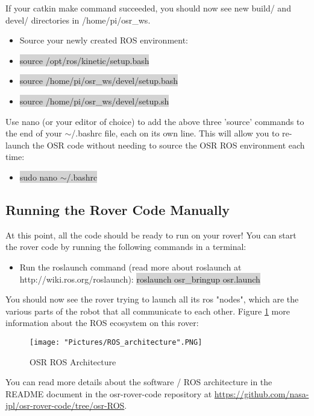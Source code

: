 \documentclass[12pt]{article}
\begin{document}
\noindent If your catkin make command succeeded, you should now see new build/ and devel/ directories in /home/pi/osr\_ws.

\begin{itemize}
	\item[] Source your newly created ROS environment: 
	\item[] \colorbox{lightgray}{source /opt/ros/kinetic/setup.bash}
	\item[] \colorbox{lightgray}{source /home/pi/osr\_ws/devel/setup.bash}
	\item[] \colorbox{lightgray}{source /home/pi/osr\_ws/devel/setup.sh}
\end{itemize}

\noindent Use nano (or your editor of choice) to add the above three 'source' commands to the end of your $\sim$/.bashrc file, each on its own line.  This will allow you to re-launch the OSR code without needing to source the OSR ROS environment each time:
\begin{itemize}
	\item[] \colorbox{lightgray}{sudo nano $\sim$/.bashrc}
\end{itemize}

\subsection{Running the Rover Code Manually}
At this point, all the code should be ready to run on your rover!  You can start the rover code by running the following commands in a terminal:
\begin{itemize}
	\item[] Run the roslaunch command (read more about roslaunch at http://wiki.ros.org/roslaunch): \colorbox{lightgray}{roslaunch osr\_bringup osr.launch}
\end{itemize}

\noindent You should now see the rover trying to launch all its ros "nodes", which are the various parts of the robot that all communicate to each other.  Figure \ref{ros architecture} more information about the ROS ecosystem on this rover:
\begin{figure}[H]
	\centering
   \texttt{[image: "Pictures/ROS\_architecture".PNG]}
	\caption{OSR ROS Architecture}
   \label{ros architecture}
\end{figure}

You can read more details about the software / ROS architecture in the README document in the osr-rover-code repository at \href{https://github.com/nasa-jpl/osr-rover-code/tree/osr-ROS}{https://github.com/nasa-jpl/osr-rover-code/tree/osr-ROS}.
\end{document}
